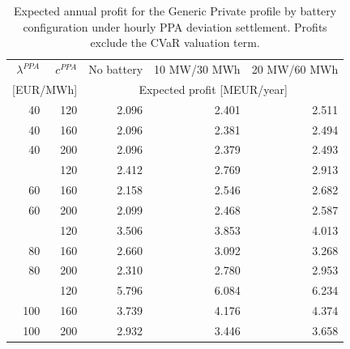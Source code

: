 \begin{table}[htbp]
\centering
\small
\caption{Expected annual profit for the Generic Private profile by battery configuration under hourly PPA deviation settlement. Profits exclude the CVaR valuation term.}
\label{tab:battery_expected_profit_generic_private}
\begin{tabular*}{\textwidth}{@{\extracolsep{\fill}}rrrrr@{}}
\toprule
$\lambda^{PPA}$ & $c^{PPA}$ & No battery & 10 MW/30 MWh & 20 MW/60 MWh \\
\multicolumn{2}{c}{[EUR/MWh]} & \multicolumn{3}{c}{Expected profit [MEUR/year]} \\
\midrule
40 & 120 & 2.096 & 2.401 & 2.511 \\
40 & 160 & 2.096 & 2.381 & 2.494 \\
40 & 200 & 2.096 & 2.379 & 2.493 \\
\addlinespace
60 & 120 & 2.412 & 2.769 & 2.913 \\
60 & 160 & 2.158 & 2.546 & 2.682 \\
60 & 200 & 2.099 & 2.468 & 2.587 \\
\addlinespace
80 & 120 & 3.506 & 3.853 & 4.013 \\
80 & 160 & 2.660 & 3.092 & 3.268 \\
80 & 200 & 2.310 & 2.780 & 2.953 \\
\addlinespace
100 & 120 & 5.796 & 6.084 & 6.234 \\
100 & 160 & 3.739 & 4.176 & 4.374 \\
100 & 200 & 2.932 & 3.446 & 3.658 \\
\bottomrule
\end{tabular*}
\end{table}
